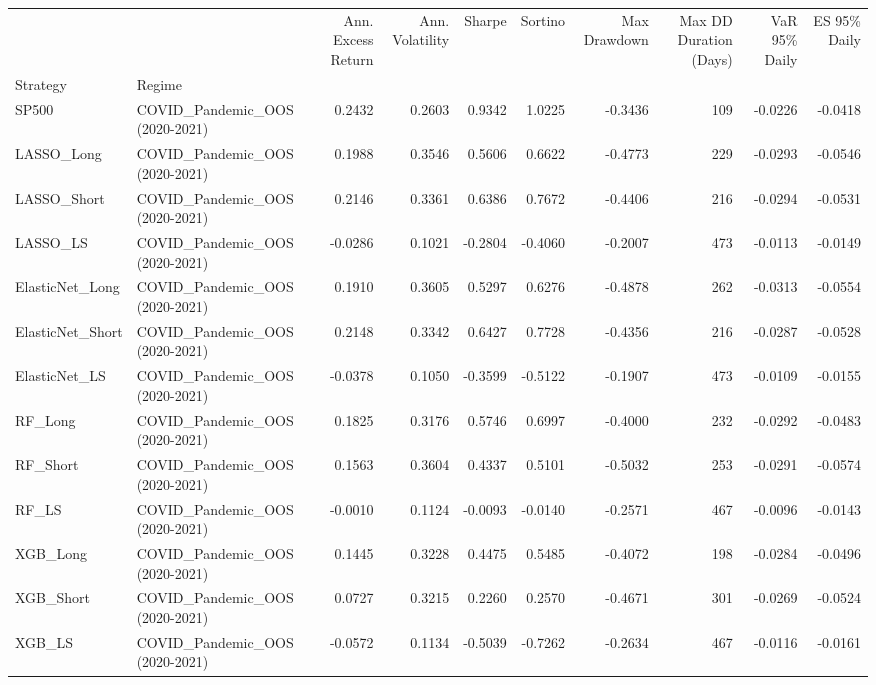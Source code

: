\begin{tabular}{llrrrrrrrr}
\toprule
 &  & Ann. Excess Return & Ann. Volatility & Sharpe & Sortino & Max Drawdown & Max DD Duration (Days) & VaR 95\% Daily & ES 95\% Daily \\
Strategy & Regime &  &  &  &  &  &  &  &  \\
\midrule
SP500 & COVID\_Pandemic\_OOS (2020-2021) & 0.2432 & 0.2603 & 0.9342 & 1.0225 & -0.3436 & 109 & -0.0226 & -0.0418 \\
\cline{1-10}
LASSO\_Long & COVID\_Pandemic\_OOS (2020-2021) & 0.1988 & 0.3546 & 0.5606 & 0.6622 & -0.4773 & 229 & -0.0293 & -0.0546 \\
\cline{1-10}
LASSO\_Short & COVID\_Pandemic\_OOS (2020-2021) & 0.2146 & 0.3361 & 0.6386 & 0.7672 & -0.4406 & 216 & -0.0294 & -0.0531 \\
\cline{1-10}
LASSO\_LS & COVID\_Pandemic\_OOS (2020-2021) & -0.0286 & 0.1021 & -0.2804 & -0.4060 & -0.2007 & 473 & -0.0113 & -0.0149 \\
\cline{1-10}
ElasticNet\_Long & COVID\_Pandemic\_OOS (2020-2021) & 0.1910 & 0.3605 & 0.5297 & 0.6276 & -0.4878 & 262 & -0.0313 & -0.0554 \\
\cline{1-10}
ElasticNet\_Short & COVID\_Pandemic\_OOS (2020-2021) & 0.2148 & 0.3342 & 0.6427 & 0.7728 & -0.4356 & 216 & -0.0287 & -0.0528 \\
\cline{1-10}
ElasticNet\_LS & COVID\_Pandemic\_OOS (2020-2021) & -0.0378 & 0.1050 & -0.3599 & -0.5122 & -0.1907 & 473 & -0.0109 & -0.0155 \\
\cline{1-10}
RF\_Long & COVID\_Pandemic\_OOS (2020-2021) & 0.1825 & 0.3176 & 0.5746 & 0.6997 & -0.4000 & 232 & -0.0292 & -0.0483 \\
\cline{1-10}
RF\_Short & COVID\_Pandemic\_OOS (2020-2021) & 0.1563 & 0.3604 & 0.4337 & 0.5101 & -0.5032 & 253 & -0.0291 & -0.0574 \\
\cline{1-10}
RF\_LS & COVID\_Pandemic\_OOS (2020-2021) & -0.0010 & 0.1124 & -0.0093 & -0.0140 & -0.2571 & 467 & -0.0096 & -0.0143 \\
\cline{1-10}
XGB\_Long & COVID\_Pandemic\_OOS (2020-2021) & 0.1445 & 0.3228 & 0.4475 & 0.5485 & -0.4072 & 198 & -0.0284 & -0.0496 \\
\cline{1-10}
XGB\_Short & COVID\_Pandemic\_OOS (2020-2021) & 0.0727 & 0.3215 & 0.2260 & 0.2570 & -0.4671 & 301 & -0.0269 & -0.0524 \\
\cline{1-10}
XGB\_LS & COVID\_Pandemic\_OOS (2020-2021) & -0.0572 & 0.1134 & -0.5039 & -0.7262 & -0.2634 & 467 & -0.0116 & -0.0161 \\

\end{tabular}
